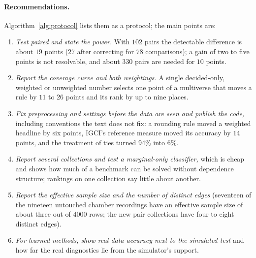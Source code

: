 \paragraph{Recommendations.} Algorithm~\ref{alg:protocol} lists them as a protocol; the main points are:
\begin{enumerate}
\item \emph{Test paired and state the power.} With $102$ pairs the detectable difference is about $19$ points ($27$ after correcting for $78$ comparisons); a gain of two to five points is not resolvable, and about $330$ pairs are needed for $10$ points.
\item \emph{Report the coverage curve and both weightings.} A single decided-only, weighted or unweighted number selects one point of a multiverse that moves a rule by $11$ to $26$ points and its rank by up to nine places.
\item \emph{Fix preprocessing and settings before the data are seen and publish the code,} including conventions the text does not fix: a rounding rule moved a weighted headline by six points, IGCI's reference measure moved its accuracy by $14$ points, and the treatment of ties turned $94\%$ into $6\%$.
\item \emph{Report several collections and test a marginal-only classifier,} which is cheap and shows how much of a benchmark can be solved without dependence structure; rankings on one collection say little about another.
\item \emph{Report the effective sample size and the number of distinct edges} (seventeen of the nineteen untouched chamber recordings have an effective sample size of about three out of $4000$ rows; the new pair collections have four to eight distinct edges).
\item \emph{For learned methods, show real-data accuracy next to the simulated test} and how far the real diagnostics lie from the simulator's support.
\end{enumerate}


